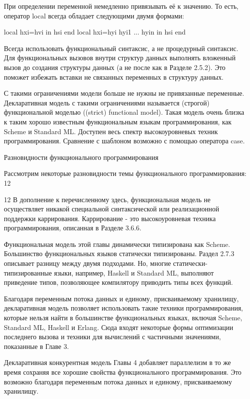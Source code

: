 При определении переменной немедленно привязывать её к значению. То есть, оператор local всегда обладает следующими двумя формами:

local hxi=hvi in hsi end
local hxi={hyi hyi1 ... hyin } in hsi end

Всегда использовать функциональный синтаксис, а не процедурный синтаксис. Для функциональных вызовов внутри структур данных выполнять вложенный вызов до создания структуры данных (а не после как в Разделе 2.5.2). Это поможет избежать вставки не связанных переменных в структуру данных.

С такими ограничениями модели больше не нужны не привязанные переменные. Декларативная модель с такими ограничениями называется (строгой) функциональной моделью ((strict) functional model). Такая модель очень близка к таким хорошо известным функциональным языкам программирования, как Scheme и Standard ML. Доступен весь спектр высокоуровневых техник программирования. Сравнение с шаблоном возможно с помощью оператора case.

Разновидности функционального программирования

Рассмотрим некоторые разновидности темы функционального программирования: 12

12 В дополнение к перечисленному здесь, функциональная модель не осуществляет никакой специальной синтаксической или реализационной поддержки каррирования. Каррирование - это высокоуровневая техника программирования, описанная в Разделе 3.6.6.

Функциональная модель этой главы динамически типизирована как Scheme. Большинство функциональных языков статически типизированы. Раздел 2.7.3 описывает разницу между двумя подходами. Но, многие статически-типизированные языки, например, Haskell и Standard ML, выполняют приведение типов, позволяющее компилятору приводить типы всех функций.

Благодаря переменным потока данных и единому, присваиваемому хранилищу, декларативная модель позволяет использовать такие техники программирования, которые нельзя найти в большинстве функциональных языках, включая Scheme, Standard ML, Haskell и Erlang. Сюда входят некоторые формы оптимизации последнего вызова и техники для вычислений с частичными значениями, показанные в Главе 3.

Декларативная конкурентная модель Главы 4 добавляет параллелизм в то же время сохраняя все хорошие свойства функционального программирования. Это возможно благодаря переменным потока данных и единому, присваиваемому хранилищу.


